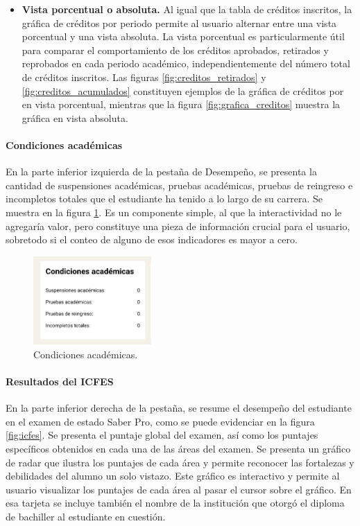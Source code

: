 \begin{itemize}
  \item \textbf{Vista porcentual o absoluta.} Al igual que la tabla de créditos inscritos, la gráfica de créditos por periodo permite al usuario alternar entre una vista porcentual y una vista absoluta. La vista porcentual es particularmente útil para comparar el comportamiento de los créditos aprobados, retirados y reprobados en cada periodo académico, independientemente del número total de créditos inscritos. Las figuras \ref{fig:creditos_retirados} y \ref{fig:creditos_acumulados} constituyen ejemplos de la gráfica de créditos por en vista porcentual, mientras que la figura \ref{fig:grafica_creditos} muestra la gráfica en vista absoluta.
\end{itemize}

\paragraph{Condiciones académicas} En la parte inferior izquierda de la pestaña de Desempeño, se presenta la cantidad de suspensiones académicas, pruebas académicas, pruebas de reingreso e incompletos totales que el estudiante ha tenido a lo largo de su carrera. Se muestra en la figura \ref{fig:condiciones_academicas}. Es un componente simple, al que la interactividad no le agregaría valor, pero constituye una pieza de información crucial para el usuario, sobretodo si el conteo de alguno de esos indicadores es mayor a cero.

\begin{figure}[H]
  \centering
  \includegraphics[width=0.4\textwidth]{img/nes/condiciones_academicas.png}
  \caption{Condiciones académicas.}
  \label{fig:condiciones_academicas}
\end{figure}

\paragraph{Resultados del ICFES} En la parte inferior derecha de la pestaña, se resume el desempeño del estudiante en el examen de estado Saber Pro, como se puede evidenciar en la figura \ref{fig:icfes}. Se presenta el puntaje global del examen, así como los puntajes específicos obtenidos en cada una de las áreas del examen. Se presenta un gráfico de radar que ilustra los puntajes de cada área y permite reconocer las fortalezas y debilidades del alumno un solo vistazo. Este gráfico es interactivo y permite al usuario visualizar los puntajes de cada área al pasar el cursor sobre el gráfico. En esa tarjeta se incluye también el nombre de la institución que otorgó el diploma de bachiller al estudiante en cuestión.

